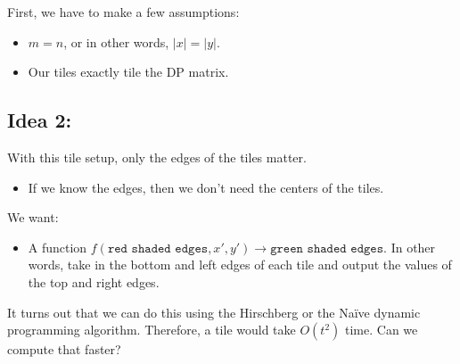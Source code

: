 \documentclass[10pt]{article}
\begin{document}
First, we have to make a few assumptions:
\begin{itemize}
	\item $m = n$, or in other words, $|x| = |y|$.
	\item Our tiles exactly tile the DP matrix.
\end{itemize}

\subsection*{Idea 2:}
With this tile setup, only the edges of the tiles matter.
\begin{itemize}
	\item If we know the edges, then we don't need the centers of the tiles.
\end{itemize}
We want:
\begin{itemize}
	\item A function $f(\texttt{red shaded edges}, x', y') \rightarrow \texttt{green shaded edges}$.  In other words, take in the bottom and left edges of each tile and output the values of the top and right edges.
\end{itemize}
It turns out that we can do this using the Hirschberg or the Na\"{i}ve dynamic programming algorithm.  Therefore, a tile would take $O(t^2)$ time.  Can we compute that faster?
\end{document}
